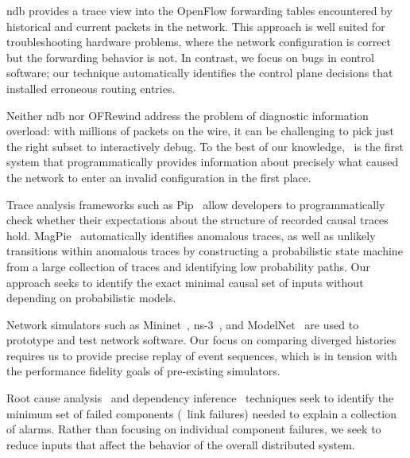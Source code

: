 {ndb provides a
trace view into the OpenFlow forwarding tables
encountered by historical and current packets in the network.
This approach is well suited for troubleshooting hardware problems, where the
network configuration is correct but the forwarding behavior is not.
In contrast, we focus on bugs in control software; our technique
automatically identifies the control plane decisions that installed
erroneous routing entries.

Neither ndb nor OFRewind address the problem of diagnostic information
overload: with millions of packets on the wire, it can
be challenging to pick just the right subset to interactively debug.
To the
best of our knowledge, \projectname~is the first system that programmatically provides
information about precisely what caused the network to enter an invalid
configuration in the first place.


Trace analysis frameworks such as Pip~\cite{pip} allow developers
to programmatically check whether their expectations about the structure of
recorded causal
traces hold. MagPie~\cite{barham2004using} automatically identifies anomalous
traces, as well as unlikely transitions within anomalous traces by constructing
a probabilistic state machine from a large collection of traces and
identifying low probability paths.
Our approach seeks to identify the exact minimal causal set of inputs without
depending on probabilistic models.

Network simulators such as
Mininet~\cite{handigol2012reproducible}, ns-3~\cite{ns3}, and ModelNet~\cite{Vahdat:2002:SAL:844128.844154}
are used to prototype and test network software.
Our focus on comparing diverged histories requires us
to provide precise replay of event sequences, which is in tension with the performance
fidelity goals of pre-existing simulators.

Root cause analysis~\cite{yemini1996} and dependency inference~\cite{Kandula:2009:DDE:1592568.1592597}
techniques seek to identify the minimum set of failed
components (\eg~link failures) needed to explain a collection of alarms. Rather than
focusing on individual component failures, we seek to reduce inputs that affect the behavior
of the overall distributed system.


} %

